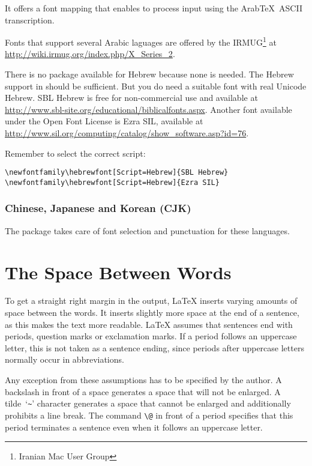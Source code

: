 It offers a font mapping that enables  to process input
using the Arab\TeX\ ASCII transcription.

Fonts that support several Arabic laguages are offered by the
IRMUG\footnote{Iranian Mac User Group} at
\url{http://wiki.irmug.org/index.php/X_Series_2}.

There is no package available for Hebrew because none is
needed. The Hebrew support in  should be sufficient. But
you do need a suitable font with real Unicode Hebrew. SBL Hebrew is free for
non-commercial use and available at
\url{http://www.sbl-site.org/educational/biblicalfonts.aspx}. Another font
available under the Open Font License is Ezra SIL, available at
\url{http://www.sil.org/computing/catalog/show_software.asp?id=76}.

Remember to select the correct script:

\begin{lscommand}
\verb|\newfontfamily\hebrewfont[Script=Hebrew]{SBL Hebrew}| \\
\verb|\newfontfamily\hebrewfont[Script=Hebrew]{Ezra SIL}|
\end{lscommand}


\subsubsection{Chinese, Japanese and Korean (CJK)}

The package \cite{xecjk} takes care of font selection and
punctuation for these languages.

\section{The Space Between Words}

To get a straight right margin in the output, \LaTeX{} inserts varying
amounts of space between the words. It inserts slightly more space at
the end of a sentence, as this makes the text more readable.  \LaTeX{}
assumes that sentences end with periods, question marks or exclamation
marks. If a period follows an uppercase letter, this is not taken as a
sentence ending, since periods after uppercase letters normally occur in
abbreviations.

Any exception from these assumptions has to be specified by the
author. A backslash in front of a space generates a space that will
not be enlarged. A tilde~`\verb|~|' character generates a space that cannot be
enlarged and additionally prohibits a line break. The command
\verb|\@| in front of a period specifies that this period terminates a
sentence even when it follows an uppercase letter.
  

